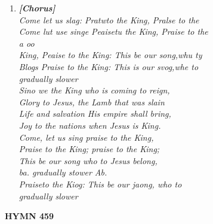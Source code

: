 \documentclass[11pt,a4paper]{article}
\begin{document}
\begin{enumerate}
    \item[] \vspace{0.4em}
    \textbf{\textit{[Chorus]}} \\
    \textit{Come let us slag: Pratwto the King, Pralse to the \\
        Come lut use singe Peaisetu the King, Praise to the \\
        a oo \\
        King, Peaise to the King: This be our song,whu ty \\
        Blogs Praise to the King: This is our svog,whe to \\
        gradually slower \\
        Sino we the King who is coming to reign, \\
        Glory to Jesus, the Lamb that was slain \\
        Life and salvation His empire shall bring, \\
        Joy to the nations when Jesus is King. \\
        Come, let us sing praise to the King, \\
        Praise to the King; praise to the King; \\
        This be our song who to Jesus belong, \\
        ba. gradually stower Ab. \\
        Praiseto the Kiog: This be our jaong, who to \\
        gradually slower}
    \vspace{0.4em}

\end{enumerate}

\newpage
\begin{center}
    {\Large \textbf{HYMN 459}}
\end{center}
\vspace{1em}
\end{document}
